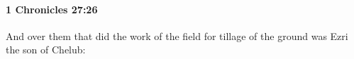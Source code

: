 
		\paragraph{1 Chronicles 27:26} %
			\label{1CHRONICLES-27-26}

			And over them that did the work of the field for tillage of the ground was Ezri the son of Chelub:



